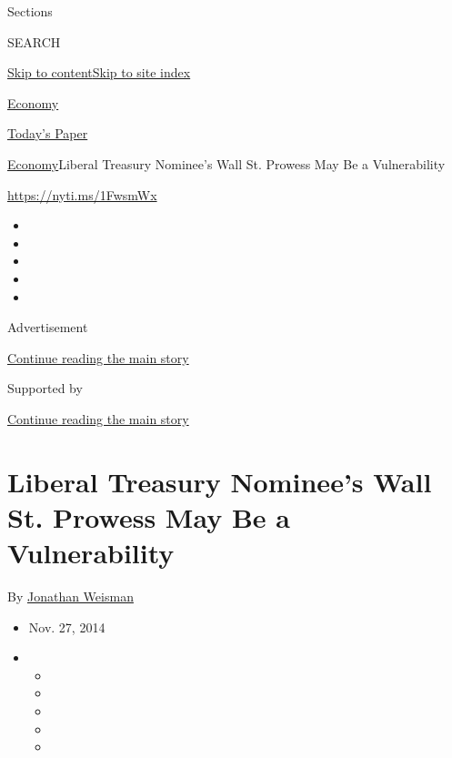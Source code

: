 Sections

SEARCH

\protect\hyperlink{site-content}{Skip to
content}\protect\hyperlink{site-index}{Skip to site index}

\href{https://www.nytimes3xbfgragh.onion/section/business/economy}{Economy}

\href{https://myaccount.nytimes3xbfgragh.onion/auth/login?response_type=cookie\&client_id=vi}{}

\href{https://www.nytimes3xbfgragh.onion/section/todayspaper}{Today's
Paper}

\href{/section/business/economy}{Economy}\textbar{}Liberal Treasury
Nominee's Wall St. Prowess May Be a Vulnerability

\url{https://nyti.ms/1FwsmWx}

\begin{itemize}
\item
\item
\item
\item
\item
\end{itemize}

Advertisement

\protect\hyperlink{after-top}{Continue reading the main story}

Supported by

\protect\hyperlink{after-sponsor}{Continue reading the main story}

\hypertarget{liberal-treasury-nominees-wall-st-prowess-may-be-a-vulnerability}{%
\section{Liberal Treasury Nominee's Wall St. Prowess May Be a
Vulnerability}\label{liberal-treasury-nominees-wall-st-prowess-may-be-a-vulnerability}}

By \href{http://www.nytimes3xbfgragh.onion/by/jonathan-weisman}{Jonathan
Weisman}

\begin{itemize}
\item
  Nov. 27, 2014
\item
  \begin{itemize}
  \item
  \item
  \item
  \item
  \item
  \end{itemize}
\end{itemize}

